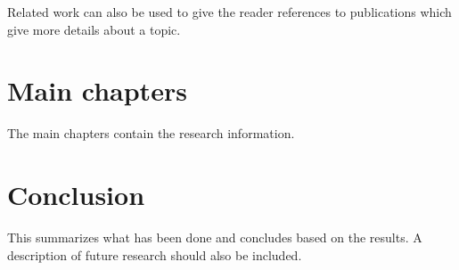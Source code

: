 \documentclass[conference]{IEEEtran}
\begin{document}
Related work can also be used to give the reader references to publications which give more details about a topic.

\section{Main chapters}

The main chapters contain the research information.

\section{Conclusion}

This summarizes what has been done and concludes based on the results. A description of future research should also be included.  



\printbibliography

\end{document}
